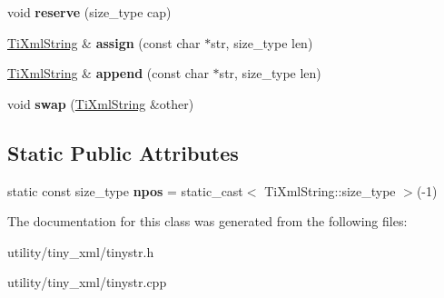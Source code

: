 \begin{DoxyCompactItemize}
\mbox{\label{class_ti_xml_string_a88ecf9f0f00cb5c67b6b637958d7049c}} 
void {\bfseries reserve} (size\+\_\+type cap)
\item 
\mbox{\label{class_ti_xml_string_ac72f3d9149b7812c1e6c59402014d0d5}} 
\hyperlink{class_ti_xml_string}{Ti\+Xml\+String} \& {\bfseries assign} (const char $\ast$str, size\+\_\+type len)
\item 
\mbox{\label{class_ti_xml_string_ad44b21700d2ec24a511367b222b643fb}} 
\hyperlink{class_ti_xml_string}{Ti\+Xml\+String} \& {\bfseries append} (const char $\ast$str, size\+\_\+type len)
\item 
\mbox{\label{class_ti_xml_string_aa392cbc180752a79f007f4f9280c7762}} 
void {\bfseries swap} (\hyperlink{class_ti_xml_string}{Ti\+Xml\+String} \&other)
\end{DoxyCompactItemize}
\subsection*{Static Public Attributes}
\begin{DoxyCompactItemize}
\item 
\mbox{\label{class_ti_xml_string_a8f4422d227088dc7bec96f479b275d0a}} 
static const size\+\_\+type {\bfseries npos} = static\+\_\+cast$<$ Ti\+Xml\+String\+::size\+\_\+type $>$(-\/1)
\end{DoxyCompactItemize}


The documentation for this class was generated from the following files\+:\begin{DoxyCompactItemize}
\item 
utility/tiny\+\_\+xml/tinystr.\+h\item 
utility/tiny\+\_\+xml/tinystr.\+cpp\end{DoxyCompactItemize}
